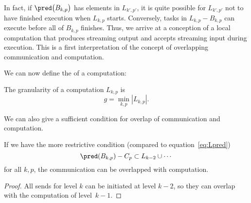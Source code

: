 In fact, if $\pred\bigl(B_{k,p}\bigr)$ has elements in $L_{k',p'}$, it is quite
possible for $L_{k',p'}$ not to have finished execution when $L_{k,p}$ starts.
Conversely, tasks in $L_{k,p}-B_{k,p}$ can execute before all of $B_{k,p}$
finishes. Thus, we arrive at a conception of a local computation that produces
streaming output and accepts streaming input during execution. This is a first 
interpretation of the concept of overlapping communication and computation.

We can now define the  of a computation:
\begin{definition}
  The granularity of a computation $L_{k,p}$ is
  \[ g = \min_{k,p} |L_{k,p}|. \]
\end{definition}

We can also give a sufficient condition for overlap of communication and computation.
\begin{theorem}
  If we have the more restrictive condition (compared to equation~\eqref{eq:Lpred})
  \[ \pred(B_{k,p})-C_p\subset L_{k-2}\cup \cdots \]
  for all $k,p$, the communication can be overlapped with computation.
\end{theorem}
\begin{proof}
  All sends for level $k$ can be initiated at level $k-2$, so they can overlap
  with the computation of level~$k-1$.
\end{proof}


